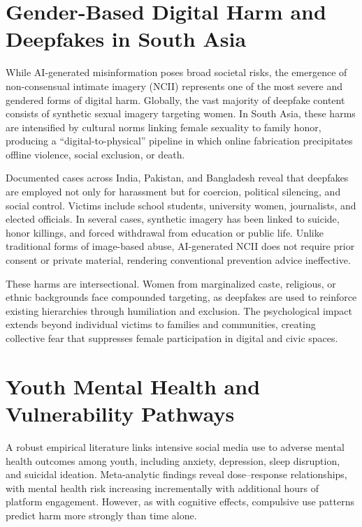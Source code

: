 \documentclass[12pt,a4paper]{report}
\begin{document}
\section{Gender-Based Digital Harm and Deepfakes in South Asia}

While AI-generated misinformation poses broad societal risks, the emergence of non-consensual intimate imagery (NCII) represents one of the most severe and gendered forms of digital harm. Globally, the vast majority of deepfake content consists of synthetic sexual imagery targeting women. In South Asia, these harms are intensified by cultural norms linking female sexuality to family honor, producing a ``digital-to-physical'' pipeline in which online fabrication precipitates offline violence, social exclusion, or death.

Documented cases across India, Pakistan, and Bangladesh reveal that deepfakes are employed not only for harassment but for coercion, political silencing, and social control. Victims include school students, university women, journalists, and elected officials. In several cases, synthetic imagery has been linked to suicide, honor killings, and forced withdrawal from education or public life. Unlike traditional forms of image-based abuse, AI-generated NCII does not require prior consent or private material, rendering conventional prevention advice ineffective.

These harms are intersectional. Women from marginalized caste, religious, or ethnic backgrounds face compounded targeting, as deepfakes are used to reinforce existing hierarchies through humiliation and exclusion. The psychological impact extends beyond individual victims to families and communities, creating collective fear that suppresses female participation in digital and civic spaces.

\section{Youth Mental Health and Vulnerability Pathways}

A robust empirical literature links intensive social media use to adverse mental health outcomes among youth, including anxiety, depression, sleep disruption, and suicidal ideation. Meta-analytic findings reveal dose–response relationships, with mental health risk increasing incrementally with additional hours of platform engagement. However, as with cognitive effects, compulsive use patterns predict harm more strongly than time alone.
\end{document}
